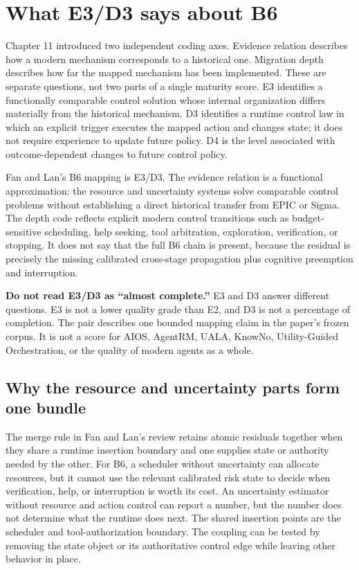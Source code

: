 \section{What E3/D3 says about B6}
\label{sec:ch16-ed-coding}

Chapter 11 introduced two independent coding axes. Evidence relation describes how a modern mechanism corresponds to a historical one. Migration depth describes how far the mapped mechanism has been implemented. These are separate questions, not two parts of a single maturity score. E3 identifies a functionally comparable control solution whose internal organization differs materially from the historical mechanism. D3 identifies a runtime control law in which an explicit trigger executes the mapped action and changes state; it does not require experience to update future policy. D4 is the level associated with outcome-dependent changes to future control policy.

Fan and Lan's B6 mapping is E3/D3. The evidence relation is a functional approximation: the resource and uncertainty systems solve comparable control problems without establishing a direct historical transfer from EPIC or Sigma. The depth code reflects explicit modern control transitions such as budget-sensitive scheduling, help seeking, tool arbitration, exploration, verification, or stopping. It does not say that the full B6 chain is present, because the residual is precisely the missing calibrated cross-stage propagation plus cognitive preemption and interruption.

\begin{warningbox}
\textbf{Do not read E3/D3 as ``almost complete.''} E3 and D3 answer different questions. E3 is not a lower quality grade than E2, and D3 is not a percentage of completion. The pair describes one bounded mapping claim in the paper's frozen corpus. It is not a score for AIOS, AgentRM, UALA, KnowNo, Utility-Guided Orchestration, or the quality of modern agents as a whole.
\end{warningbox}

\subsection{Why the resource and uncertainty parts form one bundle}
\label{sec:ch16-one-bundle}

The merge rule in Fan and Lan's review retains atomic residuals together when they share a runtime insertion boundary and one supplies state or authority needed by the other. For B6, a scheduler without uncertainty can allocate resources, but it cannot use the relevant calibrated risk state to decide when verification, help, or interruption is worth its cost. An uncertainty estimator without resource and action control can report a number, but the number does not determine what the runtime does next. The shared insertion points are the scheduler and tool-authorization boundary. The coupling can be tested by removing the state object or its authoritative control edge while leaving other behavior in place.

